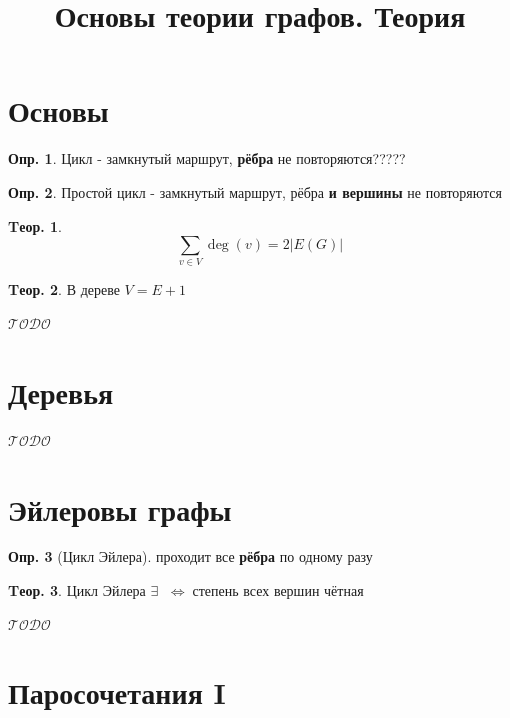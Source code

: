 \documentclass[a4paper,12pt]{article}
\title{Основы теории графов. Теория}
\author{}
\date{}
\theoremstyle{definition}
\newtheorem{definition}{Опр.}[section]
\theoremstyle{definition}
\newtheorem{theorem}{Tеор.}[section]
\def\iiff{$\;\Longleftrightarrow\;$}
\def\iiTODO{\guillemotleft$\mathcal{TODO}$\guillemotright\textellipsis}
\begin{document}
\maketitle



\section{Основы}

\begin{definition}
	Цикл - замкнутый маршрут, \textbf{рёбра} не повторяются?????
\end{definition}

\begin{definition}
	Простой цикл - замкнутый маршрут, рёбра \textbf{и вершины} не повторяются
\end{definition}

\begin{theorem}
	\[ \sum_{v \in V} \deg(v) = 2 |E(G)|  \]
\end{theorem}

\begin{theorem}
	В дереве $V = E+1$
\end{theorem}

\iiTODO



\section{Деревья}

\iiTODO



\section{Эйлеровы графы}

\begin{definition}[Цикл Эйлера] проходит все \textbf{рёбра} по одному разу \end{definition}

\begin{theorem}
	Цикл Эйлера $\exists$ \iiff степень всех вершин чётная
\end{theorem}

\iiTODO



\section{Паросочетания I}
\end{document}
